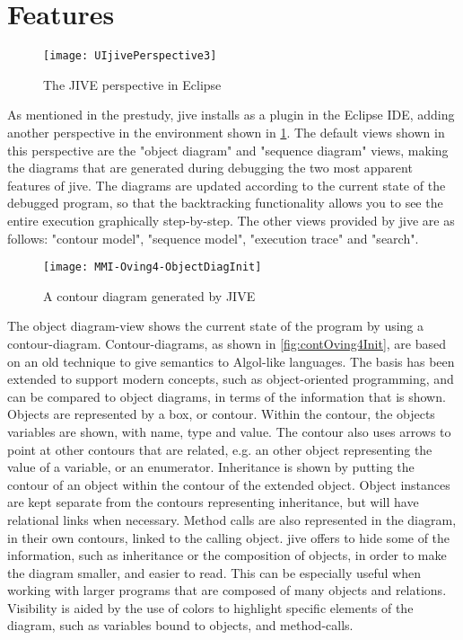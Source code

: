 \section{Features}\label{jiveFeatures}
\begin{figure}[H]
	\centering
	\texttt{[image: UIjivePerspective3]}
	\caption{The JIVE perspective in Eclipse}
	\label{fig:UIjivePerspective}
\end{figure}

As mentioned in the prestudy, \gls{jive} installs as a plugin in the Eclipse IDE, adding another perspective in the environment shown in \cref{fig:UIjivePerspective}.
The default views shown in this perspective are the "object diagram" and "sequence diagram" views, making the diagrams that are generated during debugging the two most apparent features of \gls{jive}.
The diagrams are updated according to the current state of the debugged program, so that the backtracking functionality allows you to see the entire execution graphically step-by-step.
The other views provided by \gls{jive} are as follows: "contour model", "sequence model", "execution trace" and "search".

\begin{figure}[H]
	\centering
	\texttt{[image: MMI-Oving4-ObjectDiagInit]}
	\caption{A contour diagram generated by JIVE}
	\label{fig:contOving4Init}
\end{figure}

The object diagram-view shows the current state of the program by using a contour-diagram.
Contour-diagrams, as shown in \autoref{fig:contOving4Init}, are based on an old technique to give semantics to Algol-like languages.
The basis has been extended to support modern concepts, such as object-oriented programming, and can be compared to object diagrams, in terms of the information that is shown.
Objects are represented by a box, or contour.
Within the contour, the objects variables are shown, with name, type and value.
The contour also uses arrows to point at other contours that are related, e.g. an other object representing the value of a variable, or an enumerator.
Inheritance is shown by putting the contour of an object within the contour of the extended object. 
Object instances are kept separate from the contours representing inheritance, but will have relational links when necessary.
Method calls are also represented in the diagram, in their own contours, linked to the calling object.
\gls{jive} offers to hide some of the information, such as inheritance or the composition of objects, in order to make the diagram smaller, and easier to read.
This can be especially useful when working with larger programs that are composed of many objects and relations.
Visibility is aided by the use of colors to highlight specific elements of the diagram, such as variables bound to objects, and method-calls.


